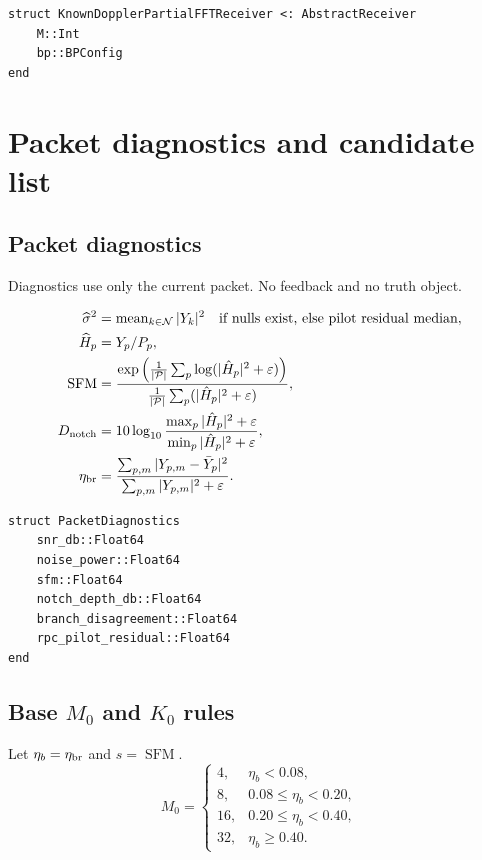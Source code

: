 \documentclass[11pt]{article}
\newcommand{\eps}{\varepsilon}
\begin{document}
\begin{lstlisting}
struct KnownDopplerPartialFFTReceiver <: AbstractReceiver
    M::Int
    bp::BPConfig
end
\end{lstlisting}

\clearpage
\section{Packet diagnostics and candidate list}

\subsection{Packet diagnostics}

Diagnostics use only the current packet. No feedback and no truth object.

\begin{align}
\widehat\sigma^2&=\operatorname{mean}_{k\in\mathcal N}|Y_k|^2\quad\text{if nulls exist, else pilot residual median},\\
\widehat H_p&=Y_p/P_p,\\
\operatorname{SFM}&=\frac{\exp\left(\frac{1}{|\mathcal P|}\sum_p\log(|\hat H_p|^2+\eps)\right)}{\frac{1}{|\mathcal P|}\sum_p(|\hat H_p|^2+\eps)},\\
D_{\rm notch}&=10\log_{10}\frac{\max_p |\hat H_p|^2+\eps}{\min_p |\hat H_p|^2+\eps},\\
\eta_{\rm br}&=\frac{\sum_{p,m}|Y_{p,m}-\bar Y_p|^2}{\sum_{p,m}|Y_{p,m}|^2+\eps}.
\end{align}

\begin{lstlisting}
struct PacketDiagnostics
    snr_db::Float64
    noise_power::Float64
    sfm::Float64
    notch_depth_db::Float64
    branch_disagreement::Float64
    rpc_pilot_residual::Float64
end
\end{lstlisting}

\subsection{Base $M_0$ and $K_0$ rules}

Let $\eta_b=\eta_{\rm br}$ and $s=\operatorname{SFM}$.
\begin{equation}
M_0=\begin{cases}
4,&\eta_b<0.08,\\
8,&0.08\le\eta_b<0.20,\\
16,&0.20\le\eta_b<0.40,\\
32,&\eta_b\ge0.40.
\end{cases}
\end{equation}
\end{document}
